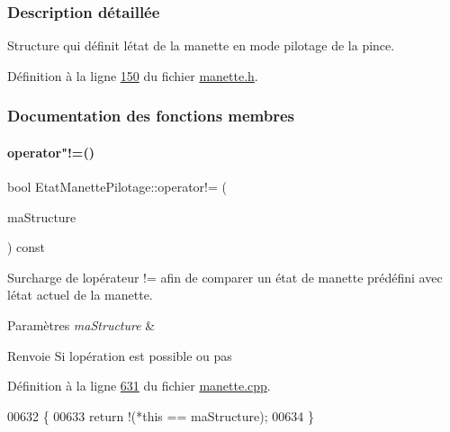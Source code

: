 \subsubsection{Description détaillée}
Structure qui définit l\textquotesingle{}état de la manette en mode pilotage de la pince. 

Définition à la ligne \hyperlink{manette_8h_source_l00150}{150} du fichier \hyperlink{manette_8h_source}{manette.\+h}.



\subsubsection{Documentation des fonctions membres}
\mbox{\label{struct_etat_manette_pilotage_a1a9cbf7891c30ab2503ec9c9b7fb5299}} 
\paragraph{\texorpdfstring{operator"!=()}{operator!=()}}
{\footnotesize\ttfamily bool Etat\+Manette\+Pilotage\+::operator!= (\begin{DoxyParamCaption}\item[{const \hyperlink{struct_etat_manette_pilotage}{Etat\+Manette\+Pilotage} \&}]{ma\+Structure }\end{DoxyParamCaption}) const}



Surcharge de l\textquotesingle{}opérateur != afin de comparer un état de manette prédéfini avec l\textquotesingle{}état actuel de la manette. 


\begin{DoxyParams}{Paramètres}
{\em ma\+Structure} & \\
\hline
\end{DoxyParams}
\begin{DoxyReturn}{Renvoie}
Si l\textquotesingle{}opération est possible ou pas 
\end{DoxyReturn}


Définition à la ligne \hyperlink{manette_8cpp_source_l00631}{631} du fichier \hyperlink{manette_8cpp_source}{manette.\+cpp}.


\begin{DoxyCode}
00632 \{
00633     \textcolor{keywordflow}{return} !(*\textcolor{keyword}{this} == maStructure);
00634 \}
\end{DoxyCode}
\mbox{\label{struct_etat_manette_pilotage_a85cac8d658fdc2d63ac54ea340ec8be8}} 
